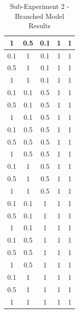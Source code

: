\begin{table}[htbp]
{\begin{minipage}{\textwidth}
\begin{tabular}{||c c c c c||}
				\hline
				1 & 0.5 & 0.1 & 1 & 1 \\ 
				\hline
				0.1 & 1 & 0.1 & 1 & 1 \\ 
				\hline
				0.5 & 1 & 0.1 & 1 & 1 \\ 
				\hline
				1 & 1 & 0.1 & 1 & 1 \\ 
				\hline
				0.1 & 0.1 & 0.5 & 1 & 1 \\ 
				\hline
				0.5 & 0.1 & 0.5 & 1 & 1 \\ 
				\hline
				1 & 0.1 & 0.5 & 1 & 1 \\ 
				\hline
				0.1 & 0.5 & 0.5 & 1 & 1 \\ 
				\hline
				0.5 & 0.5 & 0.5 & 1 & 1 \\ 
				\hline
				1 & 0.5 & 0.5 & 1 & 1 \\ 
				\hline
				0.1 & 1 & 0.5 & 1 & 1 \\ 
				\hline
				0.5 & 1 & 0.5 & 1 & 1 \\ 
				\hline
				1 & 1 & 0.5 & 1 & 1 \\ 
				\hline
				0.1 & 0.1 & 1 & 1 & 1 \\ 
				\hline
				0.5 & 0.1 & 1 & 1 & 1 \\ 
				\hline
				1 & 0.1 & 1 & 1 & 1 \\ 
				\hline
				0.1 & 0.5 & 1 & 1 & 1 \\ 
				\hline
				0.5 & 0.5 & 1 & 1 & 1 \\ 
				\hline
				1 & 0.5 & 1 & 1 & 1 \\ 
				\hline
				0.1 & 1 & 1 & 1 & 1 \\ 
				\hline
				0.5 & 1 & 1 & 1 & 1 \\ 
				\hline
				1 & 1 & 1 & 1 & 1 \\ [1ex] 
				\hline
				\hline
			\end{tabular}
	\end{minipage}}
	\caption{Sub-Experiment 2 - Branched Model Results}
	\label{table:combination_simple_1}
\end{table}

